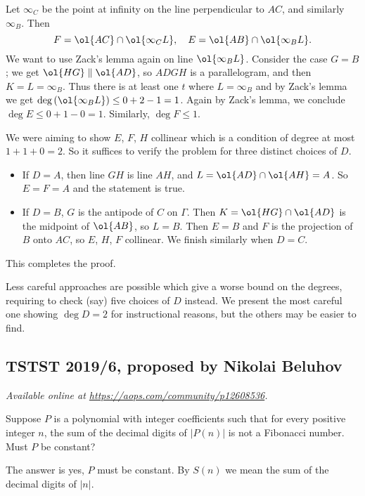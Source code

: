 \documentclass[11pt]{scrartcl}
\begin{document}
Let $\infty_C$ be the point at infinity
on the line perpendicular to $AC$, and similarly $\infty_B$.
Then \[ F = \ol{AC} \cap \ol{\infty_C L},
  \quad E = \ol{AB} \cap \ol{\infty_B L}. \]
We want to use Zack's lemma again on line $\ol{\infty_B L}$.
Consider the case $G = B$;
we get $\ol{HG} \parallel \ol{AD}$,
so $ADGH$ is a parallelogram,
and then $K = L = \infty_B$.
Thus there is at least one $t$ where $L = \infty_B$
and by Zack's lemma we get
$\deg\left( \ol{\infty_B L} \right) \le 0 + 2 - 1 = 1$.
Again by Zack's lemma,
we conclude $\deg E \le 0 + 1 - 0 = 1$.
Similarly, $\deg F \le 1$.

We were aiming to show $E$, $F$, $H$ collinear
which is a condition of degree at most $1 + 1 + 0 = 2$.
So it suffices to verify the problem for three distinct choices of $D$.
\begin{itemize}
\item If $D=A$, then line $GH$ is line $AH$,
  and $L = \ol{AD} \cap \ol{AH} = A$.
  So $E=F=A$ and the statement is true.
\item If $D=B$, $G$ is the antipode of $C$ on $\Gamma$.
  Then $K = \ol{HG} \cap \ol{AD}$ is the midpoint of $\ol{AB}$, so $L=B$.
  Then $E=B$ and $F$ is the projection of $B$ onto $AC$,
  so $E$, $H$, $F$ collinear.
\ii We finish similarly when $D=C$.
\end{itemize}
This completes the proof.

\begin{remark*}
  Less careful approaches are possible
  which give a worse bound on the degrees,
  requiring to check (say) five choices of $D$ instead.
  We present the most careful one showing $\deg D = 2$
  for instructional reasons, but the others may be easier to find.
\end{remark*}
\pagebreak

\subsection{TSTST 2019/6, proposed by Nikolai Beluhov}
\textsl{Available online at \url{https://aops.com/community/p12608536}.}
\begin{mdframed}[style=mdpurplebox,frametitle={Problem statement}]
Suppose $P$ is a polynomial with integer coefficients
such that for every positive integer $n$,
the sum of the decimal digits of $|P(n)|$
is not a Fibonacci number.
Must $P$ be constant?
\end{mdframed}
The answer is yes, $P$ must be constant.
By $S(n)$ we mean the sum of the decimal digits of $|n|$.
\end{document}
